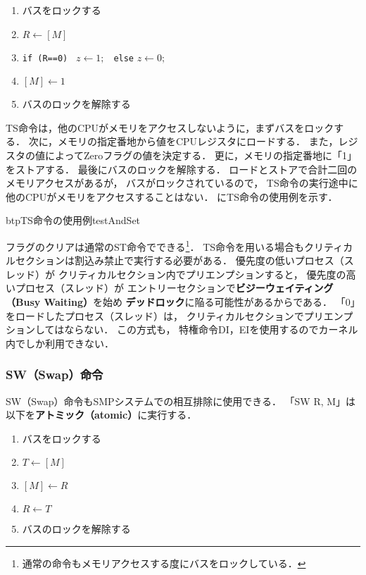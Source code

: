 \begin{enumerate}
\item バスをロックする
\item $R \leftarrow [M]$
\item {\tt if (R==0) } $z \leftarrow 1;$ {\tt ~else} $z \leftarrow 0;$
\item $[M] \leftarrow 1$
\item バスのロックを解除する
\end{enumerate}

TS命令は，他のCPUがメモリをアクセスしないように，まずバスをロックする．
次に，メモリの指定番地から値をCPUレジスタにロードする．
また，レジスタの値によってZeroフラグの値を決定する．
更に，メモリの指定番地に「1」をストアする．
最後にバスのロックを解除する．
ロードとストアで合計二回のメモリアクセスがあるが，
バスがロックされているので，
TS命令の実行途中に他のCPUがメモリをアクセスすることはない．
にTS命令の使用例を示す．

\begin{myfig}{btp}{TS命令の使用例}{testAndSet}

\end{myfig}

フラグのクリアは通常のST命令でできる\footnote{
通常の命令もメモリアクセスする度にバスをロックしている．}．
TS命令を用いる場合もクリティカルセクションは割込み禁止で実行する必要がある．
優先度の低いプロセス（スレッド）が
クリティカルセクション内でプリエンプションすると，
優先度の高いプロセス（スレッド）が
エントリーセクションで{\bf ビジーウェイティング（Busy Waiting）}を始め
{\bf デッドロック}に陥る可能性があるからである．
「0」をロードしたプロセス（スレッド）は，
クリティカルセクションでプリエンプションしてはならない．
この方式も，
特権命令DI，EIを使用するのでカーネル内でしか利用できない．

\subsubsection{SW（Swap）命令}
SW（Swap）命令もSMPシステムでの相互排除に使用できる．
「SW  R, M」は以下を{\bf アトミック（atomic）}に実行する．

\begin{enumerate}
\item バスをロックする
\item $T \leftarrow [M]$
\item $[M] \leftarrow R$
\item $R \leftarrow T$
\item バスのロックを解除する
\end{enumerate}


